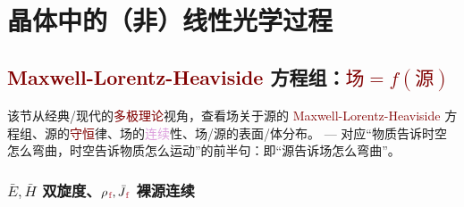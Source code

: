 \chapter{晶体中的（非）线性光学过程}\label{chap:N/LCO}

\vspace*{-8.5em}

\section{\textcolor{Maroon}{Maxwell-Lorentz-Heaviside} 方程组：\textcolor{Maroon}{$\text{场} = f(\text{源})$}}\label{sec:maxwell}

该节从经典/现代的\textcolor{Maroon}{多极理论}视角，查看场关于源的 \textcolor{Maroon}{Maxwell-Lorentz-Heaviside} 方程组、源的\textcolor{Maroon}{守恒}律、场的\textcolor{Plum}{连续}性、场/源的表面/体分布。 --- 对应“物质告诉时空怎么弯曲，时空告诉物质怎么运动”的前半句：即“源告诉场怎么弯曲”。

\vspace*{-5.0em}

\subsection{$\bar{E},\bar{H}$ 双旋度、${\rho}_{\;\!\textcolor{Maroon}{\text{f}}}, \bar{J}_{\;\!\textcolor{Maroon}{\text{f}}}$ 裸源连续}\label{ssec:EHpJf}

